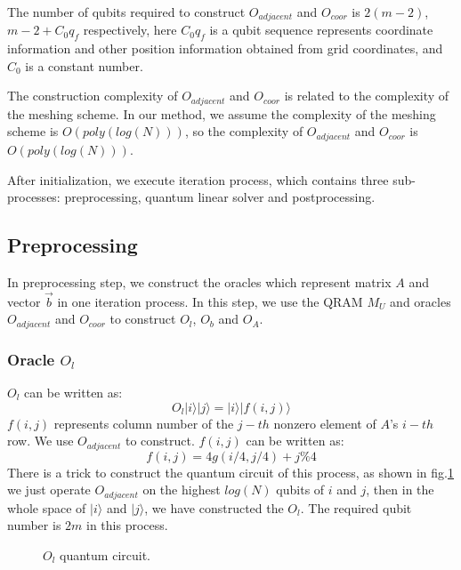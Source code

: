 \documentclass[%
 reprint,
 amsmath,amssymb,
pra,
]{revtex4-1}
\begin{document}
\begin{itemize}
The number of qubits required to construct $O_{adjacent}$ and $O_{coor}$ is $2(m-2)$, $m-2+C_0q_f$ respectively, here $C_0q_f$ is a qubit sequence represents coordinate information and other position information obtained from grid coordinates, and $C_0$ is a constant number.

The construction complexity of $O_{adjacent}$ and $O_{coor}$ is related to the complexity of the meshing scheme. In our method, we assume the complexity of the meshing scheme is $O(poly(log(N)))$, so the complexity of $O_{adjacent}$ and $O_{coor}$ is $O(poly(log(N)))$. 

After initialization, we execute iteration process, which contains three sub-processes: preprocessing, quantum linear solver and postprocessing.

\subsection{Preprocessing}

In preprocessing step, we construct the oracles which represent matrix $A$ and vector $\vec{b}$ in one iteration process. In this step, we use the QRAM $M_U$ and oracles $O_{adjacent}$ and $O_{coor}$ to construct $O_l$, $O_b$ and $O_A$. 

\subsubsection{Oracle $O_l$}
$O_l$ can be written as:
$$
O_l|i\rangle|j\rangle=|i\rangle|f(i,j)\rangle
$$
$f(i,j)$ represents column number of the $j-th$ nonzero element of $A$'s $i-th$ row. We use $O_{adjacent}$ to construct. $f(i,j)$ can be written as:
$$
f(i,j)=4g(i/4,j/4)+j\%4
$$
There is a trick to construct the quantum circuit of this process, as shown in fig.\ref{OL} we just operate $O_{adjacent}$ on the highest $log(N)$ qubits of $i$ and $j$, then in the whole space of $|i\rangle$ and $|j\rangle$, we have constructed the $O_l$. The required qubit number is $2m$ in this process. 

\begin{figure}[htbp]
    \caption{$O_l$ quantum circuit. }
    \label{OL}
\end{figure}



\end{itemize}
\end{document}
